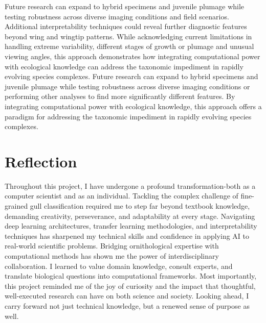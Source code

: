 \documentclass[a4paper,12pt]{report}
\begin{document}
Future research can expand to hybrid specimens and juvenile plumage while testing robustness across diverse imaging conditions and field scenarios. Additional interpretability techniques could reveal further diagnostic features beyond wing and wingtip patterns. While acknowledging current limitations in handling extreme variability, different stages of growth or plumage and unusual viewing angles, this approach demonstrates how integrating computational power with ecological knowledge can address the taxonomic impediment in rapidly evolving species complexes. Future research can expand to hybrid specimens and juvenile plumage while testing robustness across diverse imaging conditions or performing other analyses to find more significantly different features. By integrating computational power with ecological knowledge, this approach offers a paradigm for addressing the taxonomic impediment in rapidly evolving species complexes.

\section{Reflection}

Throughout this project, I have undergone a profound transformation-both as a computer scientist and as an individual. Tackling the complex challenge of fine-grained gull classification required me to step far beyond textbook knowledge, demanding creativity, perseverance, and adaptability at every stage. Navigating deep learning architectures, transfer learning methodologies, and interpretability techniques has sharpened my technical skills and confidence in applying AI to real-world scientific problems. Bridging ornithological expertise with computational methods has shown me the power of interdisciplinary collaboration. I learned to value domain knowledge, consult experts, and translate biological questions into computational frameworks. Most importantly, this project reminded me of the joy of curiosity and the impact that thoughtful, well-executed research can have on both science and society. Looking ahead, I carry forward not just technical knowledge, but a renewed sense of purpose as well.

\end{document}
